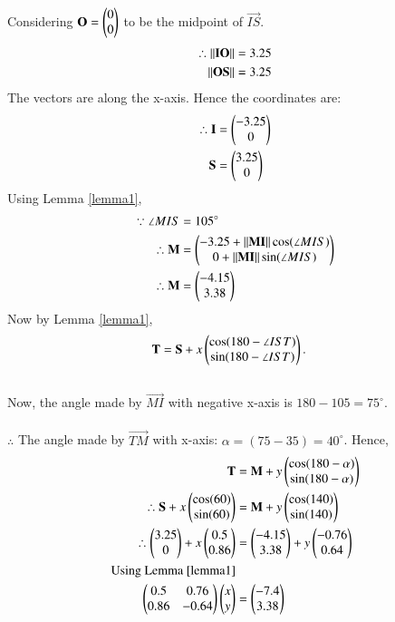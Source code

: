 \documentclass[journal,12pt,twocolumn]{IEEEtran}
\begin{document}
Considering $\mathbf{O} = \begin{pmatrix}0\\0\end{pmatrix}$ to be the midpoint of $\vec{IS}$.
\begin{align}
    \therefore\lVert\mathbf{IO}\rVert &= 3.25\\
    \lVert\mathbf{OS}\rVert &= 3.25\\
\end{align}
The vectors are along the x-axis. Hence the coordinates are:
\begin{align}
    \therefore \mathbf{I} &= \begin{pmatrix}-3.25\\0\end{pmatrix}\\
    \mathbf{S} &= \begin{pmatrix}3.25\\0\end{pmatrix}
\end{align}
Using Lemma \eqref{lemma1},
\begin{align}
    \because \angle MIS &= 105^{\circ}\\
    \therefore \mathbf{M} &= \begin{pmatrix}-3.25 + \lVert{\mathbf{MI}}\rVert\cos({\angle{MIS}})\\0 + \lVert\mathbf{MI}\rVert\sin({\angle{MIS}})\end{pmatrix}\\
    \therefore \mathbf{M} &= \begin{pmatrix}-4.15\\3.38\end{pmatrix}
\end{align}
Now by Lemma \eqref{lemma1},
\begin{align}
\mathbf{T} &= \mathbf{S} + x\begin{pmatrix}\cos(180-\angle IST)\\\sin(180-\angle IST)\end{pmatrix}.
\end{align}
\\Now, the angle made by $\vec{MI}$ with negative x-axis is $180-105 = 75^{\circ}$. \\\\
$\therefore$ The angle made by $\vec{TM}$ with x-axis: $ \alpha = (75-35) = 40^{\circ}$.
Hence,
\begin{align}
\mathbf{T} &= \mathbf{M} + y\begin{pmatrix}\cos(180 - \alpha)\\ \sin(180 - \alpha)\end{pmatrix}\\
\therefore \mathbf{S} + x\begin{pmatrix}\cos(60)\\\sin(60)\end{pmatrix} &= \mathbf{M} + y\begin{pmatrix}\cos(140)\\\sin(140)\end{pmatrix}\\
\therefore \begin{pmatrix}3.25\\0\end{pmatrix} + x\begin{pmatrix}0.5\\0.86\end{pmatrix} &= \begin{pmatrix}-4.15 \\ 3.38\end{pmatrix} + y\begin{pmatrix}-0.76\\0.64\end{pmatrix}\\
\text{Using Lemma \eqref{lemma1}}\notag\\
\begin{pmatrix}0.5 & 0.76\\ 0.86 & -0.64\end{pmatrix}\begin{pmatrix}x\\y\end{pmatrix} &= \begin{pmatrix}-7.4\\3.38\end{pmatrix} \label{eq:2.0.22}
\end{align}
\end{document}
